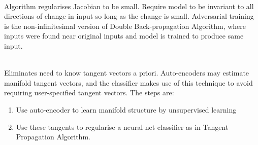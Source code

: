 \begin{remark} \\
Algorithm regularises Jacobian to be small. Require model to be invariant to all directions of change in input so long as the change is small. Adversarial training is the non-infinitesimal version of Double Back-propagation Algorithm, where inputs were found near original inputs and model is trained to produce same input.
\end{remark}

\begin{remark} \\
Eliminates need to know tangent vectors a priori. Auto-encoders may estimate manifold tangent vectors, and the classifier makes use of this technique to avoid requiring user-specified tangent vectors. The steps are:
\begin{enumerate}[label=\roman*.]
\setlength{\itemsep}{0pt}
\item Use auto-encoder to learn manifold structure by unsupervised learning
\item Use these tangents to regularise a neural net classifier as in Tangent Propagation Algorithm.
\end{enumerate}
\end{remark}